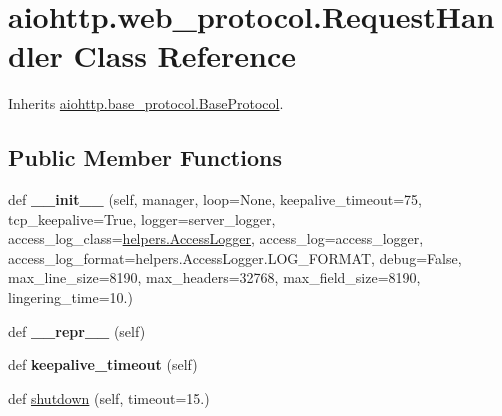 \hypertarget{classaiohttp_1_1web__protocol_1_1_request_handler}{}\section{aiohttp.\+web\+\_\+protocol.\+Request\+Handler Class Reference}
\label{classaiohttp_1_1web__protocol_1_1_request_handler}


Inherits \hyperlink{classaiohttp_1_1base__protocol_1_1_base_protocol}{aiohttp.\+base\+\_\+protocol.\+Base\+Protocol}.

\subsection*{Public Member Functions}
\begin{DoxyCompactItemize}
\item 
\mbox{\label{classaiohttp_1_1web__protocol_1_1_request_handler_ab7bf595a3948d745d8cb79eef654ee03}} 
def {\bfseries \+\_\+\+\_\+init\+\_\+\+\_\+} (self, manager, loop=None, keepalive\+\_\+timeout=75, tcp\+\_\+keepalive=True, logger=server\+\_\+logger, access\+\_\+log\+\_\+class=\hyperlink{classaiohttp_1_1helpers_1_1_access_logger}{helpers.\+Access\+Logger}, access\+\_\+log=access\+\_\+logger, access\+\_\+log\+\_\+format=helpers.\+Access\+Logger.\+L\+O\+G\+\_\+\+F\+O\+R\+M\+AT, debug=False, max\+\_\+line\+\_\+size=8190, max\+\_\+headers=32768, max\+\_\+field\+\_\+size=8190, lingering\+\_\+time=10.)
\item 
\mbox{\label{classaiohttp_1_1web__protocol_1_1_request_handler_a02ef7ccf5536dabfb96d3d705fdd0fad}} 
def {\bfseries \+\_\+\+\_\+repr\+\_\+\+\_\+} (self)
\item 
\mbox{\label{classaiohttp_1_1web__protocol_1_1_request_handler_a0d79aabb48502b0efd5acbdcc35685a8}} 
def {\bfseries keepalive\+\_\+timeout} (self)
\item 
def \hyperlink{classaiohttp_1_1web__protocol_1_1_request_handler_af66b3af02b5c875e969ad888131984e4}{shutdown} (self, timeout=15.)
\item 
\mbox{\label{classaiohttp_1_1web__protocol_1_1_request_handler_aea24c6704bae5aeee2eed9ad69281fa8}} 

\end{DoxyCompactItemize}
